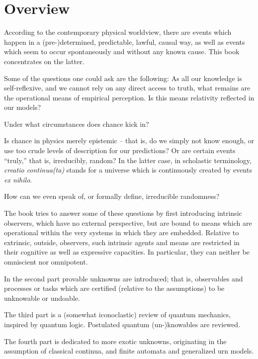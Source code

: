 %
%
%

\chapter*{Overview}
\label{2016-pu-book-proposal-Overview}

According to the contemporary physical worldview, there are events which happen in a (pre-)determined, predictable, lawful, causal way,
as well as events which seem to occur spontaneously and without any known cause.
This book concentrates on the latter.

Some of the questions one could ask are the following:
As all our knowledge is self-reflexive, and we cannot rely on any direct access to truth,
what remains are the operational means of empirical perception.
Is this means relativity reflected in our models?

Under what circumstances does chance kick in?

Is chance in physics merely epistemic -- that is, do we simply not know enough, or use too crude levels of description for our predictions?
Or are certain events ``truly,'' that is, irreducibly, random?
In the latter case, in scholastic terminology, {\it creatio continua(ta)}
stands for a universe which is continuously created by events {\it ex nihilo}.

How can we even speak of, or formally define, irreducible randomness?

The book tries to answer some of these questions by first introducing intrinsic observers, which have no external perspective,
but are bound to  means which are operational within the very systems in which they are embedded.
Relative to extrinsic, outside, observers,
such intrinsic agents and means are restricted in their cognitive as well as expressive capacities.
In particular, they can neither be omniscient nor omnipotent.

In the second part provable unknowns are introduced; that is, observables and processes or tasks which are
certified (relative to the assumptions) to be unknowable or undoable.

The third part is a (somewhat iconoclastic) review of quantum mechanics, inspired by quantum logic.
Postulated quantum (un-)knowables are reviewed.

The fourth part is dedicated to more exotic unknowns, originating in the assumption of classical continua,
and finite automata and generalized urn models.

